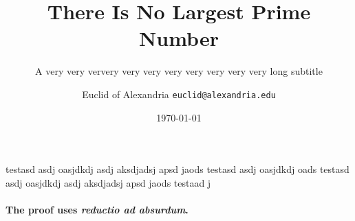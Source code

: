\documentclass[aspectratio=169]{beamer}
\title{There Is No Largest Prime Number}
\subtitle{A very very ververy very very very very very very very long subtitle}
\date{\today}
\author[Euclid]{Euclid of Alexandria \texttt{euclid@alexandria.edu}}
\begin{document}
	

\begin{frame}
\titlepage
\end{frame}


\begin{frame}{testasd asdj oasjdkdj asdj aksdjadsj apsd jaods testasd asdj oasjdkdj oads testasd asdj oasjdkdj asdj aksdjadsj apsd jaods testaad j}
	
	\framesubtitle{The proof uses \textit{reductio ad absurdum}.} 
	\blindtext[2]
\end{frame}
\end{document}
